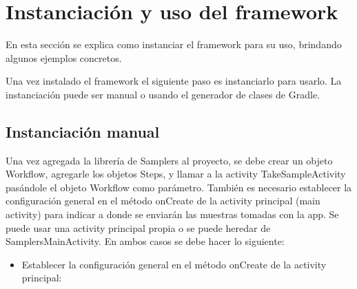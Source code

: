 \chapter{Instanciación  y uso del framework}
En esta sección se explica como instanciar el framework para su uso, brindando algunos ejemplos concretos.

Una vez instalado el framework el siguiente paso es instanciarlo para usarlo. La instanciación puede ser manual o usando el generador de clases de Gradle.


\section{Instanciación manual} \label{sec:instanciacion_manual}
Una vez agregada la librería de Samplers al proyecto, se debe crear un objeto Workflow, agregarle los objetos Steps, y llamar a la activity TakeSampleActivity pasándole el objeto Workflow como parámetro.
También es necesario establecer la configuración general en el método onCreate de la activity principal (main activity) para indicar a donde se enviarán las muestras tomadas con la app.
Se puede usar una activity principal propia o se puede heredar de SamplersMainActivity. En ambos casos se debe hacer lo siguiente:
\begin{itemize}
	\item Establecer la configuración general en el método onCreate de la activity principal:
\end{itemize}
	

